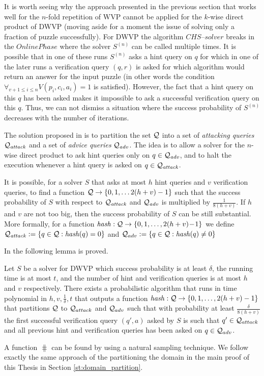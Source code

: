 It is worth seeing why the approach presented in the previous section that works well for the $n$-fold repetition of WVP
cannot be applied for the $k$-wise direct product of DWVP (moving aside for a moment the issue of solving only a fraction of puzzle successfully).
For DWVP the algorithm $\mathit{CHS\text{--}solver}$ breaks in the $\mathit{OnlinePhase}$ where
the solver $S^{(n)}$ can be called multiple times.
It is possible that in one of these runs $S^{(n)}$ asks a hint query on $q$
for which in one of the later runs a verification query $(q,r)$ is asked
for which algorithm would return an answer for the input puzzle
(in other words the condition $\forall_{v+1 \leq i \leq n} V(p_i, c_i, a_i) = 1$ is satisfied).
However, the fact that a hint query on this $q$ has been asked makes it impossible to ask a successful verification query on this $q$.
Thus, we can not dismiss a situation where the success probability of $S^{(n)}$ decreases with the number of iterations.

The solution proposed in \cite{Dodis:2009:SAI:1530441.1530450} is to partition the set $\mathcal{Q}$ into a set of \textit{attacking queries} $\mathcal{Q}_{\mathit{attack}}$
and a set of \textit{advice queries} $\mathcal{Q}_{\mathit{adv}}$. The idea is to allow a solver for the $n$-wise direct product to ask hint
queries only on $q \in \mathcal{Q}_{\mathit{adv}}$, and to halt the execution whenever a hint query is asked on $q \in \mathcal{Q}_{\mathit{attack}}$.

It is possible, for a solver $S$ that asks at most $h$ hint queries and $v$ verification queries,
to find a function $\mathcal{Q} \rightarrow \{0,1,\dotsc 2(h+v)-1\}$ such that the success probability of $S$ with respect to
$\mathcal{Q}_{\mathit{attack}}$ and $\mathcal{Q}_{\mathit{adv}}$ is multiplied by $\frac{1}{8(h+v)}$.
If $h$ and $v$ are not too big, then the success probability of $S$ can be still substantial.
More formally, for a function $\operatorname{\mathit{hash}}:\mathcal{Q} \rightarrow \{0,1,\dotsc, 2(h+v)\!-\!1 \}$
we define $\mathcal{Q}_{\mathit{attack}} := \{q \in \mathcal{Q} : \operatorname{\mathit{hash}}(q) = 0 \}$ and $\mathcal{Q}_{adv} := \{q \in \mathcal{Q}: \operatorname{\mathit{hash}}(q) \neq 0\}$

In \cite{Dodis:2009:SAI:1530441.1530450} the following lemma is proved.
\begin{lemma}
  \label{lemma:hash_function_previous}
Let $S$ be a solver for DWVP which success probability is at least $\delta$, the running time is at most $t$,
and the number of hint and verification queries is at most $h$ and $v$ respectively.
There exists a probabilistic algorithm that runs in time polynomial in $h,v,\frac{1}{\delta},t$
that outputs a function $\operatorname{\mathit{hash}} : \mathcal{Q} \rightarrow \{0,1, \dotsc, 2(h+v)-1\}$
that partitions $\mathcal{Q}$ to $\mathcal{Q}_{attack}$ and $\mathcal{Q}_{adv}$ such that
with probability at least $\frac{\delta}{8(h+v)}$ the first successful verification query $(q',a)$ asked by $S$ is such that $q' \in \mathcal{Q}_{attack}$
and all previous hint and verification queries has been asked on $q \in \mathcal{Q}_{adv}$.
\end{lemma}
A function $\hash$ can be found by using a natural sampling technique.
We follow exactly the same approach of the partitioning the domain in the main proof of this Thesis in Section \ref{st:domain_partition}.

